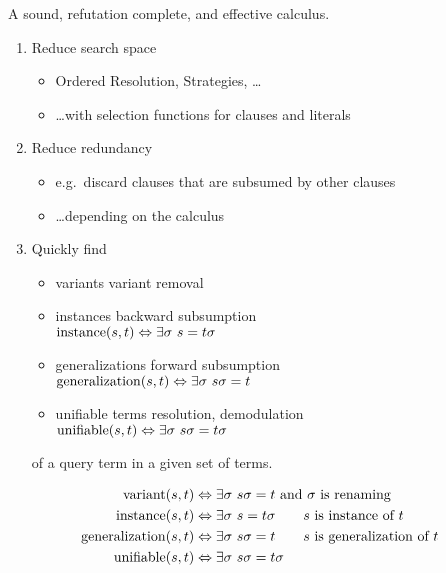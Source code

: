 \begin{goal}
	A sound, refutation complete, and
	 {effective} calculus.
	\begin{enumerate}
		\item {Reduce} search space
		\begin{itemize}
			\item Ordered Resolution, Strategies, \ldots
			\item \ldots with selection functions for clauses and literals
		\end{itemize}
		\item {Reduce} redundancy
		\begin{itemize}
			\item e.g.~discard clauses that are subsumed by other clauses
			\item \ldots depending on the calculus
		\end{itemize}
		\item Quickly find
		\begin{itemize}
			\item {variants} \hfill{\footnotesize variant removal}

			\item {instances}   \hfill{\footnotesize backward subsumption}\\
			\( \operatorname{instance}(s,t)\Leftrightarrow\exists\sigma\ s = t\sigma \)

			\item {generalizations}  \hfill{\footnotesize forward subsumption}\\
			\( \GNRL(s,t)\Leftrightarrow\exists\sigma\ s\sigma = t \)

			\item {unifiable terms} \hfill{\footnotesize resolution, demodulation}\\
			\( \UNIF(s,t)\Leftrightarrow\exists\sigma\ s\sigma = t\sigma \)

		\end{itemize}

		of a query term in a given set of terms.
	\end{enumerate}
\end{goal}

\begin{definition}
	\begin{align*}
	\operatorname{variant}(s,t)&\Leftrightarrow \exists\sigma\ s\sigma = t\text{ and }\sigma\text{ is renaming}\\
	\operatorname{instance}(s,t)&\Leftrightarrow\exists\sigma\ s = t\sigma\tag*{\( s \) is instance of \( t \)}\\
	\operatorname{generalization}(s,t)&\Leftrightarrow\exists\sigma\ s\sigma = t\tag*{\( s \) is generalization of \( t \)}\\
	\operatorname{unifiable}(s,t)&\Leftrightarrow\exists\sigma\ s\sigma = t\sigma
	\end{align*}
\end{definition}

